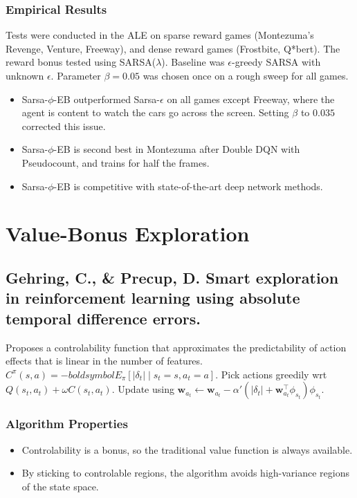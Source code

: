 \documentclass[12pt, oneside]{amsart}
\begin{document}
\subsubsection*{Empirical Results}
Tests were conducted in the ALE on sparse reward games (Montezuma's Revenge, Venture, Freeway), and dense reward games (Frostbite, Q*bert). The reward bonus tested using SARSA($\lambda$). Baseline was $\epsilon$-greedy SARSA with unknown $\epsilon$. Parameter $\beta = 0.05$ was chosen once on a rough sweep for all games.
\begin{itemize}
	\item Sarsa-$\phi$-EB outperformed Sarsa-$\epsilon$ on all games except Freeway, where the agent is content to watch the cars go across the screen. Setting $\beta$ to $0.035$ corrected this issue.
	\item Sarsa-$\phi$-EB is second best in Montezuma after Double DQN with Pseudocount, and trains for half the frames. 
	\item Sarsa-$\phi$-EB is competitive with state-of-the-art deep network methods.
\end{itemize}

\section*{Value-Bonus Exploration}

\subsection*{Gehring, C., \& Precup, D. Smart exploration in reinforcement learning using absolute temporal difference errors.}
Proposes a controlability function that approximates the predictability of action effects that is linear in the number of features. $C^\pi(s,a)=-boldsymbol{E}_\pi[|\delta_t| \mid s_t=s,a_t=a].$ Pick actions greedily wrt $Q(s_t, a_t) + \omega C(s_t, a_t)$.  Update using $\boldsymbol{w}_{a_t} \leftarrow \boldsymbol{w}_{a_t} - \alpha\prime(|\delta_t| + \boldsymbol{w}^\top_{a_t}\phi_{s_t})\phi_{s_t}$.

\subsubsection*{Algorithm Properties}
\begin{itemize}
	\item Controlability is a bonus, so the traditional value function is always available.
	\item By sticking to controlable regions, the algorithm avoids high-variance regions of the state space.
\end{itemize}
\end{document}
